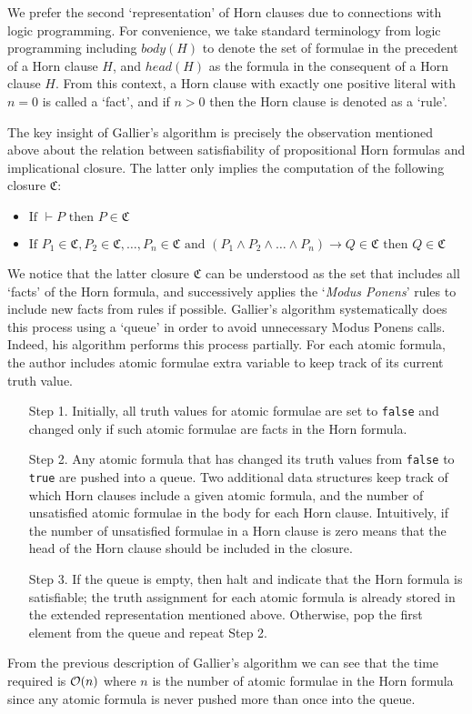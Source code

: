 We prefer the second `representation' of Horn clauses due to connections
with logic programming. For convenience, we take standard terminology from
logic programming including $body(H)$ to denote the set of formulae in the
precedent of a Horn clause $H$, and $head(H)$ as the formula in the consequent
of a Horn clause $H$. From this context, a Horn clause with exactly one
positive literal with $n = 0$ is called a `fact', and if $n > 0$ then the
Horn clause is denoted as a `rule'.

The key insight of Gallier's algorithm is precisely the observation mentioned
above about the relation between satisfiability of propositional Horn formulas
and implicational closure. The latter only implies the computation of the
following closure $\mathfrak{C}$:

\begin{itemize}
\item $\text{If } \vdash P \text{ then } P \in \mathfrak{C}$
  
\item $\text{If } P_1 \in \mathfrak{C}, P_2 \in \mathfrak{C}, \dots,
  P_n \in \mathfrak{C} \text{ and } (P_1 \land P_2 \land \dots
  \land P_n) \rightarrow Q \in \mathfrak{C} \text{ then } Q \in \mathfrak{C}$  
\end{itemize}

We notice that the latter closure $\mathfrak{C}$ can be understood as the set
that includes all `facts' of the Horn formula, and successively applies the
`\textit{Modus Ponens}' rules to include new facts from rules if possible.
Gallier's algorithm systematically does this process using a `queue' in order
to avoid unnecessary Modus Ponens calls. Indeed, his algorithm performs this
process partially. For each atomic formula, the author includes
atomic formulae extra variable to keep track of its current truth value.

\begin{itemize}
\item[Step 1.] Initially, all truth values for atomic formulae are set to \texttt{false} 
  and changed only if such atomic formulae are facts in the Horn formula.
\item[Step 2.] Any atomic formula that has changed its truth values from \texttt{false} to
\texttt{true} are pushed into a queue. Two additional data structures keep track
of which Horn clauses include a given atomic formula, and the number of unsatisfied
atomic formulae in the body for each Horn clause. Intuitively, if the number of
unsatisfied formulae in a Horn clause is zero means that the head of the Horn clause
should be included in the closure.
\item[Step 3.] If the queue is empty, then halt and indicate that the Horn formula is
  satisfiable; the truth assignment for each atomic formula is already stored in the
  extended representation mentioned above. Otherwise, pop the first element
  from the queue
  and repeat Step 2.
\end{itemize}

From the previous description of Gallier's algorithm we can see that the
time required is $\mathcal{O}(n)$ where $n$ is the number of atomic formulae in the
Horn formula since any atomic formula is never pushed more than once into the
queue.